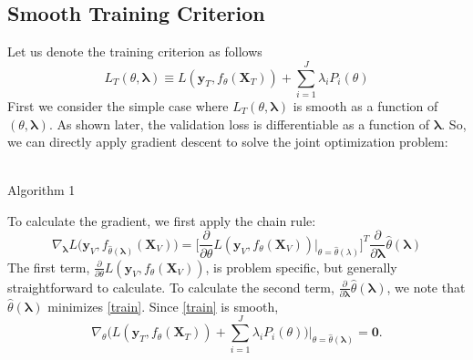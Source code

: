 \documentclass[10pt,letterpaper]{article}
\begin{document}
\subsection{Smooth Training Criterion}
Let us denote the training criterion as follows
\begin{equation}
L_T\left(\theta, \boldsymbol{\lambda}\right) \equiv L(\boldsymbol{y}_T, f_\theta (\boldsymbol{X}_T)) + \sum\limits_{i=1}^J \lambda_i P_i(\theta)
\label{train}
\end{equation}
First we consider the simple case where $L_T\left(\theta, \boldsymbol{\lambda}\right)$ is smooth as a function of $(\theta, \boldsymbol{\lambda})$. As shown later, the validation loss is differentiable as a function of $\boldsymbol{\lambda}$. So, we can directly apply gradient descent to solve the joint optimization problem:
\begin{center}
  \\
  Algorithm 1
\end{center}
To calculate the gradient, we first apply the chain rule:
\begin{equation}
\nabla_{\boldsymbol{\lambda}} L \Big( \boldsymbol{y}_V, f_{\hat{\theta}(\boldsymbol{\lambda})}(\boldsymbol{X}_V) \Big ) = 
\Big [\frac{\partial}{\partial \theta} L ( \boldsymbol{y}_V, f_{\theta}(\boldsymbol{X}_V)) \Big |_{\theta=\hat{\theta}(\lambda)} \Big ]^T 
\frac{\partial}{\partial \boldsymbol{\lambda}} \hat{\theta}(\boldsymbol{\lambda})
\label{chainrule}
\end{equation}
The first term, $\frac{\partial}{\partial \theta} L ( \boldsymbol{y}_V, f_{\theta}(\boldsymbol{X}_V))$, is problem specific, but generally straightforward to calculate. To calculate the second term, $\frac{\partial}{\partial \boldsymbol{\lambda}} \hat{\theta}(\boldsymbol{\lambda})$, we note that $\hat{\theta}(\boldsymbol{\lambda})$ minimizes \eqref{train}. Since \eqref{train} is smooth,
\begin{equation}
\nabla_\theta \Big ( L(\boldsymbol{y}_T, f_\theta (\boldsymbol{X}_T)) + \sum\limits_{i=1}^J \lambda_i P_i(\theta) \Big ) \Big |_{\theta = \hat \theta(\boldsymbol{\lambda})} = \boldsymbol{0}.
\label{eq:grad}
\end{equation}
\end{document}
